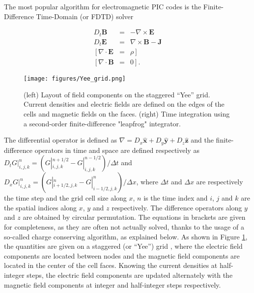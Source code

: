 

The most popular algorithm for electromagnetic PIC codes is the Finite-Difference
Time-Domain (or FDTD) solver

\begin{subequations}
\begin{eqnarray}
D_{t}\mathbf{B} & = & -\nabla\times\mathbf{E}\label{Eq:Faraday-2}\\
D_{t}\mathbf{E} & = & \nabla\times\mathbf{B}-\mathbf{J}\label{Eq:Ampere-2}\\
\left[\nabla\cdot\mathbf{E}\right. & = & \left.\rho\right]\label{Eq:Gauss-2}\\
\left[\nabla\cdot\mathbf{B}\right. & = & \left.0\right].\label{Eq:divb-2}
\end{eqnarray}
\end{subequations}

\begin{figure}
\texttt{[image: figures/Yee\_grid.png]}
\caption{\label{fig:yee_grid}(left) Layout of field components on the staggered ``Yee'' grid. Current densities and electric fields are defined on the edges of the cells and magnetic fields on the faces. (right) Time integration using a second-order finite-difference "leapfrog" integrator.}
\end{figure}

The differential operator is defined as $\nabla=D_{x}\mathbf{\hat{x}}+D_{y}\mathbf{\hat{y}}+D_{z}\mathbf{\hat{z}}$
and the finite-difference operators in time and space are defined
respectively as $ $$D_{t}G|_{i,j,k}^{n}=\left(G|_{i,j,k}^{n+1/2}-G|_{i,j,k}^{n-1/2}\right)/\Delta t$$ $
and $D_{x}G|_{i,j,k}^{n}=\left(G|_{i+1/2,j,k}^{n}-G|_{i-1/2,j,k}^{n}\right)/\Delta x$,
where $\Delta t$ and $\Delta x$ are respectively the time step and
the grid cell size along $x$, $n$ is the time index and $i$, $j$
and $k$ are the spatial indices along $x$, $y$ and $z$ respectively.
The difference operators along $y$ and $z$ are obtained by circular
permutation. The equations in brackets are given for completeness,
as they are often not actually solved, thanks to the usage of a so-called
charge conserving algorithm, as explained below. As shown in Figure
\ref{fig:yee_grid}, the quantities are given on a staggered (or ``Yee'')
grid \cite{Yee}, where the electric field components are located
between nodes and the magnetic field components are located in the
center of the cell faces. Knowing the current densities at half-integer steps, 
the electric field components are updated alternately with the magnetic 
field components at integer and half-integer steps respectively.
